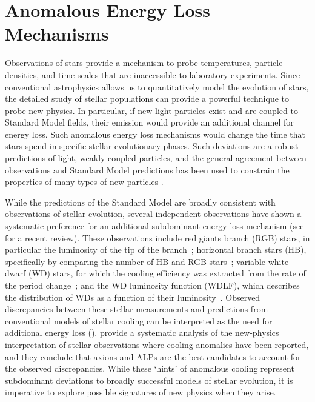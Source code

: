 \section{Anomalous Energy Loss Mechanisms}
\label{sec:cooling}


Observations of stars provide a mechanism to probe temperatures, particle densities, and time scales that are inaccessible to laboratory experiments.
Since conventional astrophysics allows us to quantitatively model the evolution of stars, the detailed study of stellar populations can provide a powerful technique to probe new physics.
In particular, if new light particles exist and are coupled to Standard Model fields, their emission would provide an additional channel for energy loss. 
Such anomalous energy loss mechanisms would change the time that stars spend in specific stellar evolutionary phases.
Such deviations are a robust predictions of light, weakly coupled particles, and the general agreement between observations and Standard Model predictions has been used to constrain the properties of many types of new particles \citep{hep-ph/0611350, 1210.1271, 1302.3884, 1305.2920, 1611.03864, 1611.05852, 1803.00993}.

While the predictions of the Standard Model are broadly consistent with observations of stellar evolution, several independent observations have shown a systematic preference for an additional subdominant energy-loss mechanism (see \citealt{Giannotti:2017hny} for a recent review).
These observations include red giants branch (RGB) stars, in particular the luminosity of the tip of the branch~\citep{Viaux:2013lha,Viaux:2013hca}; 
horizontal branch stars (HB), specifically by comparing the number of HB and RGB stars~\citep{Ayala:2014,Straniero:2015nvc};
variable white dwarf (WD) stars, for which the cooling efficiency was extracted from the rate of the period change~\citep{KeplerEtAl,Isern:1992gia,BischoffKim:2007ve,Corsico:2012ki,Corsico:2012sh,Corsico:2014mpa,Corsico:2016okh,Battich:2016htm}; 
and the WD luminosity function (WDLF), which describes the distribution of WDs as a function of their luminosity~\citep{Isern:2008nt,Bertolami:2014wua,Isern:2018uce}.
Observed discrepancies between these stellar measurements and predictions from conventional models of stellar cooling can be interpreted as the need for additional energy loss ().
\cite{Giannotti:2015kwo} provide a systematic analysis of the new-physics interpretation of stellar observations  where cooling anomalies have been reported, and they conclude that axions and ALPs are the best candidates to account for the observed discrepancies. 
While these `hints' of anomalous cooling represent subdominant deviations to broadly successful models of stellar evolution, it is imperative to explore possible signatures of new physics when they arise.

